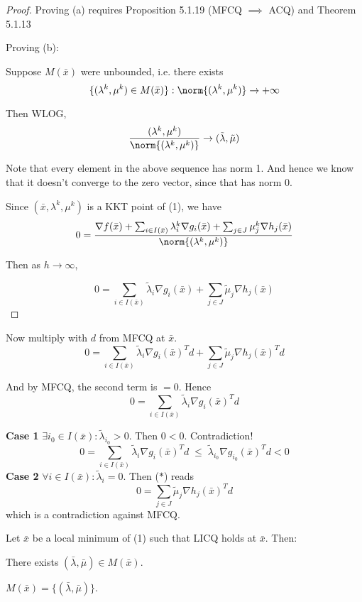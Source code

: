 \begin{proof}
	Proving (a) requires Proposition 5.1.19 (MFCQ $\implies$ ACQ) and
	Theorem 5.1.13

	Proving (b):

	Suppose $M(\bar x)$ were unbounded, i.e. there exists
	$$
		\{(\lambda^k,\mu^k)\in M(\bar x)\} : \norm{(\lambda^k,\mu^k)}\to+\infty
	$$

	Then WLOG,
	$$
		\frac{(\lambda^k,\mu^k)}{\norm{(\lambda^k,\mu^k)}}\to(\tilde\lambda,\tilde\mu)
	$$

	Note that every element in the above sequence has norm 1. And hence
	we know that it doesn't converge to the zero vector, since that has
	norm 0.

	Since $(\bar x,\lambda^k,\mu^k)$ is a KKT point of (1), we have
	$$
		0 = \frac{\nabla f(\bar x) + \sum_{i\in I(\bar x)}\lambda^k_i\nabla g_i(\bar x)
			+ \sum_{j\in J}\mu^k_j\nabla h_j(\bar x)}{\norm{(\lambda^k,\mu^k)}}
	$$

	Then as $h\to\infty$,

	\begin{equation}
		0=\sum_{i\in I(\bar x)}\tilde\lambda_i\nabla g_i(\bar x)
		+ \sum_{j\in J}\tilde\mu_j\nabla h_j(\bar x)
	\end{equation} %

\end{proof}

Now multiply with $d$ from MFCQ at $\bar x$.
\begin{equation}
	0=\sum_{i\in I(\bar x)}\tilde\lambda_i\nabla g_i(\bar x)^Td
	+ \sum_{j\in J}\tilde\mu_j\nabla h_j(\bar x)^Td \tag*{($*$)}
\end{equation}

And by MFCQ, the second term is $=0$. Hence
$$
	0=\sum_{i\in I(\bar x)}\tilde\lambda_i\nabla g_i(\bar x)^Td
$$

\textbf{Case 1} $\exists i_0 \in I(\bar x): \tilde\lambda_{i_0}>0$. Then
$0<0$. Contradiction!
$$
	0=\sum_{i\in I(\bar x)}\tilde\lambda_i\nabla g_i(\bar x)^Td
	\;\leq\;\tilde\lambda_{i_0}\nabla g_{i_0}(\bar x)^Td<0
$$
\textbf{Case 2} $\forall i\in I(\bar x):\tilde\lambda_i=0$. Then ($*$) reads
$$
	0=\sum_{j\in J}\tilde\mu_j\nabla h_j(\bar x)^Td
$$
which is a contradiction against MFCQ.

\label{c55a5f3}

Let $\bar x$ be a local minimum of (1) such that LICQ holds at $\bar
	x$. Then:
\begin{enumerata}
	\item There exists $(\bar\lambda,\bar\mu)\in M(\bar x)$.
	\item $M(\bar x) = \{(\bar\lambda,\bar\mu)\}$.
\end{enumerata}

